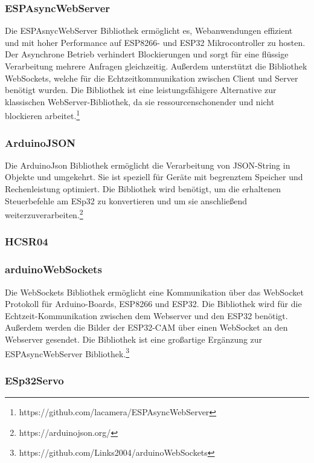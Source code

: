 \documentclass[ngerman,12pt,a4paper]{article}
\begin{document}
			\subsubsection*{ESPAsyncWebServer}
			
	Die ESPAsnycWebServer Bibliothek ermöglicht es, Webanwendungen effizient und mit hoher Performance auf ESP8266- und ESP32 Mikrocontroller zu hosten. Der Asynchrone Betrieb verhindert Blockierungen und sorgt für eine flüssige Verarbeitung mehrere Anfragen gleichzeitig. Außerdem unterstützt die Bibliothek WebSockets, welche für die Echtzeitkommunikation zwischen Client und Server benötigt wurden. Die Bibliothek ist eine leistungsfähigere Alternative zur klassischen WebServer-Bibliothek, da sie ressourcenschonender und nicht blockieren arbeitet.\footnote{https://github.com/lacamera/ESPAsyncWebServer}
	
			\subsubsection*{ArduinoJSON}
			
	Die ArduinoJson Bibliothek ermöglicht die Verarbeitung von JSON-String in Objekte und umgekehrt. Sie ist speziell für Geräte mit begrenztem Speicher und Rechenleistung optimiert. Die Bibliothek wird benötigt, um die erhaltenen Steuerbefehle am ESp32 zu konvertieren und um sie anschließend weiterzuverarbeiten.\footnote{https://arduinojson.org/}
			
			\subsubsection*{HCSR04}
			
			\subsubsection*{arduinoWebSockets}
			
	Die WebSockets Bibliothek ermöglicht eine Kommunikation über das WebSocket Protokoll für Arduino-Boards, ESP8266 und ESP32. Die Bibliothek wird für die Echtzeit-Kommunikation zwischen dem Webserver und den ESP32 benötigt. Außerdem werden die Bilder der ESP32-CAM über einen WebSocket an den Webserver gesendet. Die Bibliothek ist eine großartige Ergänzung zur ESPAsyncWebServer Bibliothek.\footnote{https://github.com/Links2004/arduinoWebSockets}
			
			\subsubsection*{ESp32Servo}
			
\end{document}
